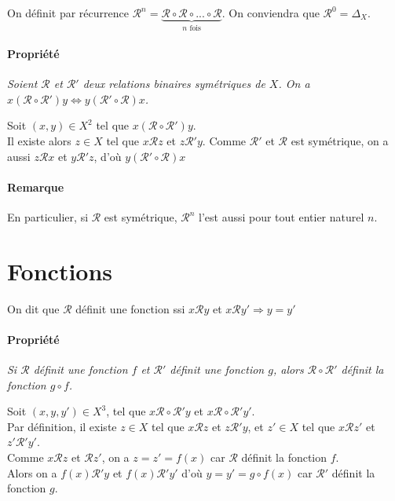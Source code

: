 \documentclass{scrartcl}
\begin{document}
		On définit par récurrence $\mathcal{R}^n = \underbrace{\mathcal{R}\circ\mathcal{R}\circ...\circ\mathcal{R}}_{n \text{ fois}}$.
		On conviendra que $\mathcal{R}^0 = \Delta_X$. 

		\paragraph{Propriété} \textsl{Soient $\mathcal{R}$ et $\mathcal{R'}$ deux relations binaires symétriques de $X$. 
		On a $x\left(\mathcal{R}\circ\mathcal{R'}\right)y \Leftrightarrow y\left(\mathcal{R'}\circ\mathcal{R}\right)x$.}
		\begin{demo}
			\item Soit $(x,y)\in X^2$ tel que $x\left(\mathcal{R}\circ\mathcal{R}'\right)y$.\\
			Il existe alors $z \in X$ tel que $x\mathcal{R}z$ et $z\mathcal{R'}y$. 
			Comme $\mathcal{R'}$ et $\mathcal{R}$ est symétrique, on a aussi $z\mathcal{R}x$ et $y\mathcal{R'}z$,
			d'où $y\left(\mathcal{R'}\circ\mathcal{R}\right)x$
		\end{demo}

		\paragraph{Remarque} En particulier, si $\mathcal{R}$ est symétrique, $\mathcal{R}^n$ l'est aussi pour tout entier naturel $n$.

	\section{Fonctions}
		On dit que $\mathcal{R}$ définit une fonction ssi $x\mathcal{R}y$ et $x\mathcal{R}y' \Rightarrow y = y'$

		\paragraph{Propriété} \textsl{Si $\mathcal{R}$ définit une fonction $f$ et $\mathcal{R}'$ définit une fonction $g$, 
			alors $\mathcal{R}\circ\mathcal{R}'$ définit la fonction $g\circ f$.}
		\begin{demo}
			\item Soit $(x,y,y') \in X^3$, 
			tel que $x\mathcal{R}\circ\mathcal{R'}y$ et $x\mathcal{R}\circ\mathcal{R'}y'$. \\
			Par définition, il existe $z \in X$ tel que $x\mathcal{R}z$ et $z\mathcal{R}'y$, 
			et $z' \in X$ tel que $x\mathcal{R}z'$ et $z'\mathcal{R}'y'$.\\
			Comme $x\mathcal{R}z$ et $\mathcal{R}z'$, on a $z=z'=f(x)$ car $\mathcal{R}$ définit la fonction $f$. \\
			Alors on a $f(x)\mathcal{R}'y$ et $f(x)\mathcal{R}'y'$ d'où $y=y'=g\circ f(x)$ car $\mathcal{R}'$ définit la fonction $g$.
		\end{demo}
\end{document}
